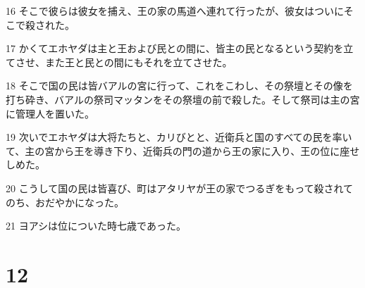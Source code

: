 \par 16 そこで彼らは彼女を捕え、王の家の馬道へ連れて行ったが、彼女はついにそこで殺された。
\par 17 かくてエホヤダは主と王および民との間に、皆主の民となるという契約を立てさせ、また王と民との間にもそれを立てさせた。
\par 18 そこで国の民は皆バアルの宮に行って、これをこわし、その祭壇とその像を打ち砕き、バアルの祭司マッタンをその祭壇の前で殺した。そして祭司は主の宮に管理人を置いた。
\par 19 次いでエホヤダは大将たちと、カリびとと、近衛兵と国のすべての民を率いて、主の宮から王を導き下り、近衛兵の門の道から王の家に入り、王の位に座せしめた。
\par 20 こうして国の民は皆喜び、町はアタリヤが王の家でつるぎをもって殺されてのち、おだやかになった。
\par 21 ヨアシは位についた時七歳であった。

\chapter{12}

